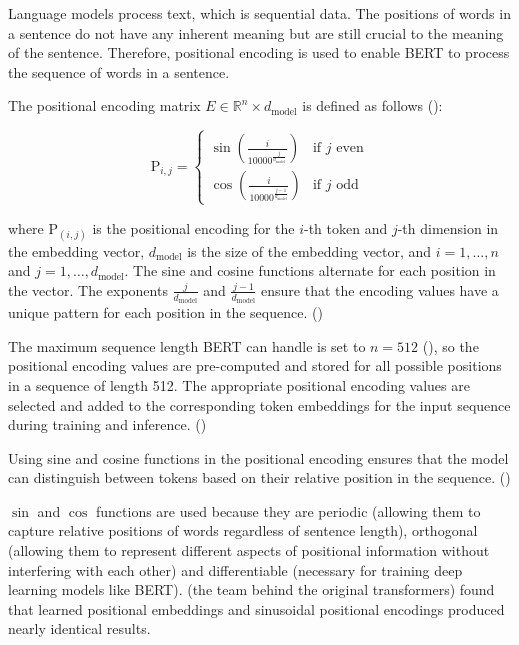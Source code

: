 Language models process text, which is sequential data. The positions of words in a sentence do not have any inherent meaning but are still crucial to the meaning of the sentence. Therefore, positional encoding is used to enable BERT to process the sequence of words in a sentence.

The positional encoding matrix $E \in \mathbb{R}^{n} \times d_{\text{model}}$ is defined as follows (\cite{geron_hands-machine_2019}):

$$ \text{P}_{i,j} =
\begin{cases}
\sin\left(\frac{i}{10000^\frac{j}{d_{\text{model}}}}\right)
& \text{if } j \text{ even} \\
\cos\left(\frac{i}{10000^\frac{j-1}{d_{\text{model}}}}\right)
& \text{if } j \text{ odd}
\end{cases} $$

where $\text{P}_{(i,j)}$ is the positional encoding for the $i$-th token and $j$-th dimension in the embedding vector, $d_{\text{model}}$ is the size of the embedding vector, and $i = 1, \dots, n$ and $j = 1, \dots, d_{\text{model}}$. The sine and cosine functions alternate for each position in the vector. The exponents $\frac{j}{d_{\text{model}}}$ and $\frac{j-1}{d_{\text{model}}}$ ensure that the encoding values have a unique pattern for each position in the sequence. (\cite{geron_hands-machine_2019})

The maximum sequence length BERT can handle is set to $n = 512$ (\cite{devlin_bert_2019}), so the positional encoding values are pre-computed and stored for all possible positions in a sequence of length 512.
The appropriate positional encoding values are selected and added to the corresponding token embeddings for the input sequence during training and inference. (\cite{geron_hands-machine_2019})

Using sine and cosine functions in the positional encoding ensures that the model can distinguish between tokens based on their relative position in the sequence. (\cite{geron_hands-machine_2019})

$\sin$ and $\cos$ functions are used because they are periodic (allowing them to capture relative positions of words regardless of sentence length), orthogonal (allowing them to represent different aspects of positional information without interfering with each other) and differentiable (necessary for training deep learning models like BERT). \cite{vaswani_attention_2017} (the team behind the original transformers) found that learned positional embeddings and sinusoidal positional encodings produced nearly identical results. 

